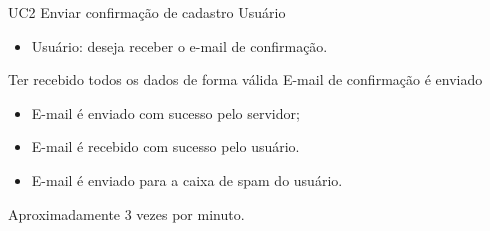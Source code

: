 
\casoDeUso
{UC2}
{Enviar confirmação de cadastro}
{Usuário}
{
\begin{itemize}
	\item Usuário: deseja receber o e-mail de confirmação.
\end{itemize}

}
{Ter recebido todos os dados de forma válida}
{E-mail de confirmação é enviado}
{
\begin{itemize}
	\item E-mail é enviado com sucesso pelo servidor;
	\item E-mail é recebido com sucesso pelo usuário.	
\end{itemize}
}
{
\begin{itemize}
\item E-mail é enviado para a caixa de spam do usuário.
\end{itemize}
}
{Aproximadamente 3 vezes por  minuto.}
{
 
}


